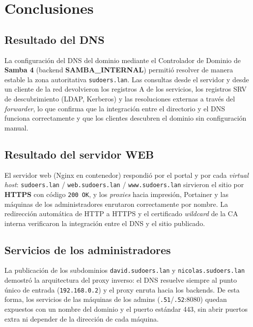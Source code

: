 
\section{Conclusiones}

\subsection{Resultado del DNS}

La configuraci\'on del DNS del dominio mediante el Controlador de Dominio de
\textbf{Samba 4} (backend \textbf{SAMBA\_INTERNAL}) permiti\'o resolver de
manera estable la zona autoritativa \texttt{sudoers.lan}. Las consultas desde
el servidor y desde un cliente de la red devolvieron los registros A de los
servicios, los registros SRV de descubrimiento (LDAP, Kerberos) y las
resoluciones externas a trav\'es del \textit{forwarder}, lo que confirma que
la integraci\'on entre el directorio y el DNS funciona correctamente y que los
clientes descubren el dominio sin configuraci\'on manual.

\subsection{Resultado del servidor WEB}

El servidor web (Nginx en contenedor) respondi\'o por el portal y por cada
\textit{virtual host}: \texttt{sudoers.lan} / \texttt{web.sudoers.lan} /
\texttt{www.sudoers.lan} sirvieron el sitio por \textbf{HTTPS} con c\'odigo
\texttt{200 OK}, y los \textit{proxies} hacia impresi\'on, Portainer y las
m\'aquinas de los administradores enrutaron correctamente por nombre. La
redirecci\'on autom\'atica de HTTP a HTTPS y el certificado \textit{wildcard}
de la CA interna verificaron la integraci\'on entre el DNS y el sitio
publicado.

\subsection{Servicios de los administradores}

La publicaci\'on de los subdominios \texttt{david.sudoers.lan} y
\texttt{nicolas.sudoers.lan} demostr\'o la arquitectura del proxy inverso: el
DNS resuelve siempre al punto \'unico de entrada (\texttt{192.168.0.2}) y el
proxy enruta hacia los backends. De esta forma, los servicios de las m\'aquinas
de los admins (\texttt{.51}/\texttt{.52}:8080) quedan expuestos con un nombre
del dominio y el puerto est\'andar 443, sin abrir puertos extra ni depender de
la direcci\'on de cada m\'aquina.

